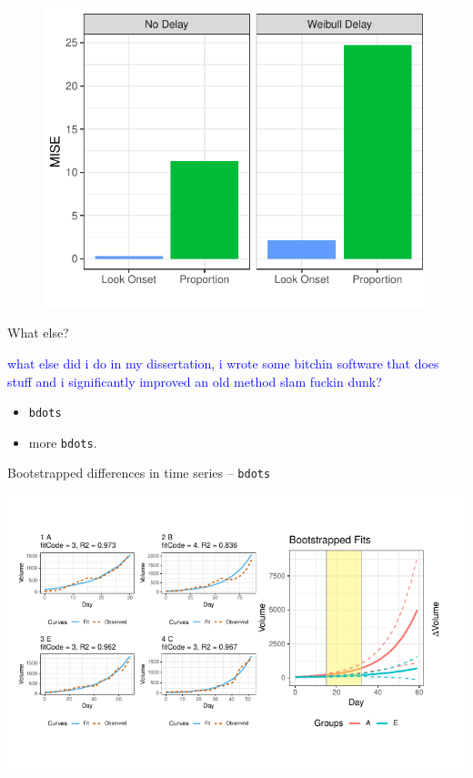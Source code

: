 \documentclass{beamer}
\newcommand{\xt}{\texttt}
\providecommand{\cn}[1]{\textcolor{blue}{#1}}
\begin{document}
\begin{frame}
\begin{figure}
\centering
\includegraphics{mise_bar.pdf}
\end{figure}
\end{frame}



\begin{frame}{What else?}

\cn{what else did i do in  my dissertation, i wrote some bitchin software that does stuff and i significantly improved an old method slam fuckin dunk?}

\begin{itemize}
\item \xt{bdots}
\item more \xt{bdots}.
\end{itemize}
\end{frame}




\begin{frame}{Bootstrapped differences in time series -- \texttt{bdots}}
\vspace{-1mm}
\begin{center}
\includegraphics{bdots_examples.pdf}
\end{center}
\end{frame}
\end{document}
